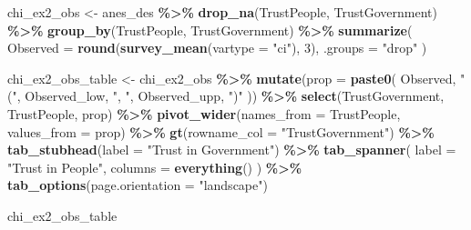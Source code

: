 \documentclass[
]{krantz}
\makeatletter
\newenvironment{Shaded}{\begin{snugshade}}{\end{snugshade}}
\newcommand{\AttributeTok}[1]{\textcolor[rgb]{0.27,0.27,0.27}{#1}}
\newcommand{\DecValTok}[1]{\textcolor[rgb]{0.06,0.06,0.06}{#1}}
\newcommand{\FunctionTok}[1]{\textcolor[rgb]{0.27,0.27,0.27}{\textbf{#1}}}
\newcommand{\NormalTok}[1]{#1}
\newcommand{\OtherTok}[1]{\textcolor[rgb]{0.37,0.37,0.37}{#1}}
\newcommand{\SpecialCharTok}[1]{\textcolor[rgb]{0.43,0.43,0.43}{\textbf{#1}}}
\newcommand{\StringTok}[1]{\textcolor[rgb]{0.5,0.5,0.5}{#1}}
\newenvironment{kframe}{%
\medskip{}
\setlength{\fboxsep}{.8em}
 \def\at@end@of@kframe{}%
 \ifinner\ifhmode%
  \def\at@end@of@kframe{\end{minipage}}%
  \begin{minipage}{\columnwidth}%
 \fi\fi%
 \def\FrameCommand##1{\hskip\@totalleftmargin \hskip-\fboxsep
 \colorbox{shadecolor}{##1}\hskip-\fboxsep
     \hskip-\linewidth \hskip-\@totalleftmargin \hskip\columnwidth}%
 \MakeFramed {\advance\hsize-\width
   \@totalleftmargin\z@ \linewidth\hsize
   \@setminipage}}%
 {\par\unskip\endMakeFramed%
 \at@end@of@kframe}
\renewenvironment{Shaded}{\begin{kframe}}{\end{kframe}}
\makeatother
\begin{document}
\begin{Shaded}
\begin{Highlighting}[]
\NormalTok{chi\_ex2\_obs }\OtherTok{\textless{}{-}}\NormalTok{ anes\_des }\SpecialCharTok{\%\textgreater{}\%}
  \FunctionTok{drop\_na}\NormalTok{(TrustPeople, TrustGovernment) }\SpecialCharTok{\%\textgreater{}\%}
  \FunctionTok{group\_by}\NormalTok{(TrustPeople, TrustGovernment) }\SpecialCharTok{\%\textgreater{}\%}
  \FunctionTok{summarize}\NormalTok{(}
    \AttributeTok{Observed =} \FunctionTok{round}\NormalTok{(}\FunctionTok{survey\_mean}\NormalTok{(}\AttributeTok{vartype =} \StringTok{"ci"}\NormalTok{), }\DecValTok{3}\NormalTok{),}
    \AttributeTok{.groups =} \StringTok{"drop"}
\NormalTok{  )}

\NormalTok{chi\_ex2\_obs\_table }\OtherTok{\textless{}{-}}\NormalTok{ chi\_ex2\_obs }\SpecialCharTok{\%\textgreater{}\%}
  \FunctionTok{mutate}\NormalTok{(}\AttributeTok{prop =} \FunctionTok{paste0}\NormalTok{(}
\NormalTok{    Observed, }\StringTok{" ("}\NormalTok{, Observed\_low, }\StringTok{", "}\NormalTok{,}
\NormalTok{    Observed\_upp, }\StringTok{")"}
\NormalTok{  )) }\SpecialCharTok{\%\textgreater{}\%}
  \FunctionTok{select}\NormalTok{(TrustGovernment, TrustPeople, prop) }\SpecialCharTok{\%\textgreater{}\%}
  \FunctionTok{pivot\_wider}\NormalTok{(}\AttributeTok{names\_from =}\NormalTok{ TrustPeople, }\AttributeTok{values\_from =}\NormalTok{ prop) }\SpecialCharTok{\%\textgreater{}\%}
  \FunctionTok{gt}\NormalTok{(}\AttributeTok{rowname\_col =} \StringTok{"TrustGovernment"}\NormalTok{) }\SpecialCharTok{\%\textgreater{}\%}
  \FunctionTok{tab\_stubhead}\NormalTok{(}\AttributeTok{label =} \StringTok{"Trust in Government"}\NormalTok{) }\SpecialCharTok{\%\textgreater{}\%}
  \FunctionTok{tab\_spanner}\NormalTok{(}
    \AttributeTok{label =} \StringTok{"Trust in People"}\NormalTok{,}
    \AttributeTok{columns =} \FunctionTok{everything}\NormalTok{()}
\NormalTok{  ) }\SpecialCharTok{\%\textgreater{}\%}
  \FunctionTok{tab\_options}\NormalTok{(}\AttributeTok{page.orientation =} \StringTok{"landscape"}\NormalTok{)}
\end{Highlighting}
\end{Shaded}

\begin{Shaded}
\begin{Highlighting}[]
\NormalTok{chi\_ex2\_obs\_table}
\end{Highlighting}
\end{Shaded}
\end{document}
